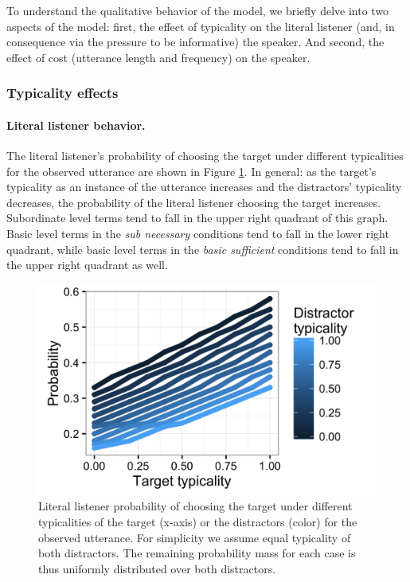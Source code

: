 \documentclass[11pt]{article}
\newcommand{\figref}[1]{Figure \ref{#1}}
\begin{document}
To understand the qualitative behavior of the model, we briefly delve into two aspects of the model: first, the effect of typicality on the literal listener (and, in consequence via the pressure to be informative) the speaker. And second, the effect of cost (utterance length and frequency) on the speaker.

\subsubsection{Typicality effects}

\paragraph{Literal listener behavior.} The literal listener's probability of choosing the target under different typicalities for the observed utterance are shown in \figref{fig:nominallistenertypicality}. In general: as the target's typicality as an instance of the utterance increases and the distractors' typicality decreases, the probability of the literal listener choosing the target increases. Subordinate level terms tend to fall in the upper right quadrant of this graph. Basic level terms in the \emph{sub necessary} conditions tend to fall in the lower right quadrant, while basic level terms in the \emph{basic sufficient} conditions tend to fall in the upper right quadrant as well.

\begin{figure}
\centering
\includegraphics[width=.5\textwidth]{../../../models/6_qualitative_nom_L0/L0probs.png}
\caption{Literal listener probability of choosing the target under different typicalities of the target (x-axis) or the distractors (color) for the observed utterance. For simplicity we assume equal typicality of both distractors. The remaining probability mass for each case is thus uniformly distributed over both distractors.}
\label{fig:nominallistenertypicality}
\end{figure}
\end{document}
